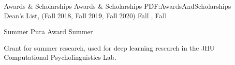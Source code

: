 \documentclass[letterpaper,MMMyyyy,nonstopmode,14pt]{simpleresumecv}
\begin{document}
\begin{Body}

\Section
{Awards \&\newline
Scholarships}
{Awards \& Scholarships}
{PDF:AwardsAndScholarships}
\BulletItem
Dean's List,
(Fall 2018, Fall 2019, Fall 2020)
\hfill
Fall , Fall  

\BulletItem
Summer Pura Award
\hfill
Summer 
\begin{Detail}
    \SubBulletItem Grant for summer research, used for deep learning research in the JHU Computational Psycholinguistics Lab. 
\end{Detail}
\end{Body}

\end{document}

